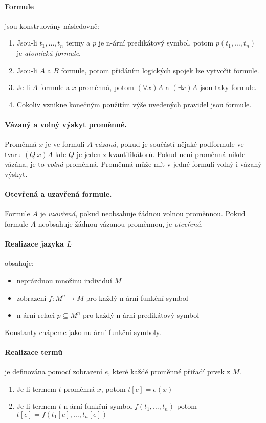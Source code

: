 \documentclass[a4paper]{article}      %
\begin{document}
\paragraph{Formule} jsou konstruovány následovně:
\begin{enumerate}
\item Jsou-li $t_1,\ldots,t_{n}$ termy a $p$ je n-ární predikátový symbol, potom $p(t_1,\ldots,t_{n})$ je \emph{atomická formule}.
\item Jsou-li $A$ a $B$ formule, potom přidáním logických spojek lze vytvořit formule.
\item Je-li $A$ formule a $x$ proměnná, potom $(\forall x)A$ a $(\exists x)A$ jsou taky formule.
\item Cokoliv vznikne konečným použitím výše uvedených pravidel jsou formule.
\end{enumerate}

\paragraph{Vázaný a volný výskyt proměnné.} Proměnná $x$ je ve formuli $A$ \emph{vázaná}, pokud je součástí nějaké podformule ve tvaru
$(Q\ x)A$ kde $Q$ je jeden z kvantifikátorů. Pokud není proměnná nikde vázána, je to \emph{volná} proměnná.
Proměnná může mít v jedné formuli volný i vázaný výskyt.

\paragraph{Otevřená a uzavřená formule.} Formule $A$ je \emph{uzavřená}, pokud neobsahuje žádnou volnou proměnnou. Pokud formule $A$ neobsahuje žádnou vázanou proměnnou, je \emph{otevřená}.

\paragraph{Realizace jazyka $L$} obsahuje:
\begin{itemize}
\item neprázdnou množinu individuí $M$
\item zobrazení $f: M^{n} \rightarrow M$ pro každý n-ární funkční symbol
\item n-ární relaci $p \subseteq M^{n}$ pro každý n-ární predikátový symbol 
\end{itemize}
Konstanty chápeme jako nulární funkční symboly.

\paragraph{Realizace termů} je definována pomocí zobrazení $e$, které každé proměnné přiřadí prvek z $M$.
\begin{enumerate}
\item Je-li termem $t$ proměnná $x$, potom $t[e] = e(x)$
\item Je-li termem $t$ n-ární funkční symbol $f(t_1,\ldots,t_{n})$ potom $t[e] = f(t_1[e],\ldots,t_{n}[e])$ 
\end{enumerate}
\end{document}
